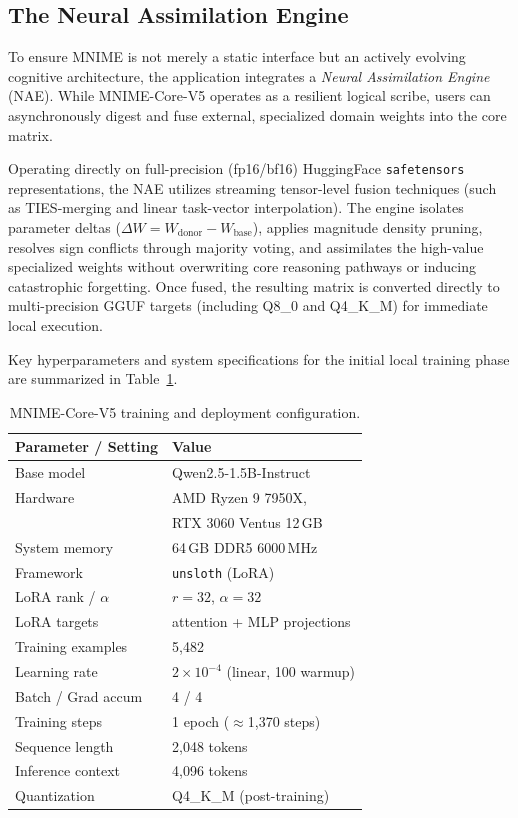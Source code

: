 \documentclass[11pt]{article}
\begin{document}
\subsection{The Neural Assimilation Engine}

To ensure MNIME is not merely a static interface but an actively evolving cognitive architecture, the application integrates a \textit{Neural Assimilation Engine} (NAE). While MNIME-Core-V5 operates as a resilient logical scribe, users can asynchronously digest and fuse external, specialized domain weights into the core matrix. 

Operating directly on full-precision (fp16/bf16) HuggingFace \texttt{safetensors} representations, the NAE utilizes streaming tensor-level fusion techniques (such as TIES-merging and linear task-vector interpolation). The engine isolates parameter deltas ($\Delta W = W_{\text{donor}} - W_{\text{base}}$), applies magnitude density pruning, resolves sign conflicts through majority voting, and assimilates the high-value specialized weights without overwriting core reasoning pathways or inducing catastrophic forgetting. Once fused, the resulting matrix is converted directly to multi-precision GGUF targets (including Q8\_0 and Q4\_K\_M) for immediate local execution.

Key hyperparameters and system specifications for the initial local training phase are summarized in Table~\ref{tab:training}.

\begin{table}[h!]
\centering
\small
\begin{tabular}{@{}p{3.1cm}p{4.1cm}@{}}
\toprule
\textbf{Parameter / Setting} & \textbf{Value} \\
\midrule
Base model & Qwen2.5-1.5B-Instruct \\
Hardware & AMD Ryzen 9 7950X, \\
         & RTX 3060 Ventus 12\,GB \\
System memory & 64\,GB DDR5 6000\,MHz \\
Framework & \texttt{unsloth} (LoRA) \\
LoRA rank / $\alpha$ & $r=32$, $\alpha=32$ \\
LoRA targets & attention + MLP projections \\
Training examples & 5,482 \\
Learning rate & $2 \times 10^{-4}$ (linear, 100 warmup) \\
Batch / Grad accum & 4 / 4 \\
Training steps & 1 epoch ($\approx$1,370 steps) \\
Sequence length & 2,048 tokens \\
Inference context & 4,096 tokens \\
Quantization & Q4\_K\_M (post-training) \\
\bottomrule
\end{tabular}
\caption{MNIME-Core-V5 training and deployment configuration.}
\label{tab:training}
\end{table}
\end{document}
